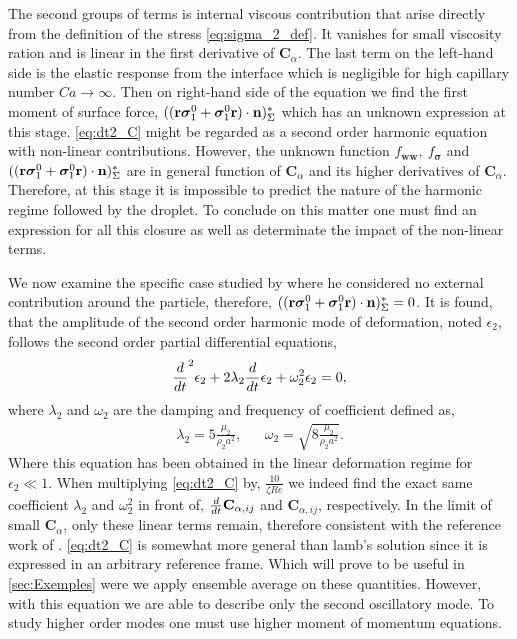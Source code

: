 The second groups of terms is internal viscous contribution that arise directly from the definition of the stress \ref{eq:sigma_2_def}. 
It vanishes for small viscosity ration and is linear in the first derivative of $\textbf{C}_\alpha$. 
The last term on the left-hand side is the elastic response from the interface which is negligible for high capillary number $Ca \to \infty$. 
Then on right-hand side of the equation we find the first moment of surface force, $( (\textbf{r}\bm\sigma_1^0+ \bm\sigma_1^0\textbf{r})\cdot \textbf{n} )_{\Sigma}^*$ which has an unknown expression at this stage. 
\ref{eq:dt2_C} might be regarded as a second order harmonic equation with non-linear contributions. 
However, the unknown function $f_\textbf{ww},\ f_{\bm{\sigma}}$ and $( (\textbf{r}\bm\sigma_1^0+ \bm\sigma_1^0\textbf{r})\cdot \textbf{n} )_{\Sigma}^*$ are in general function of $\textbf{C}_\alpha$ and its higher derivatives of $\textbf{C}_\alpha$.   
Therefore, at this stage it is impossible to predict the nature of the harmonic regime followed by the droplet. 
To conclude on this matter one must find an expression for all this closure as well as determinate the impact of the non-linear terms.

We now examine the specific case studied by \citet{lamb1924hydrodynamics} where he considered no external contribution around the particle, therefore, $( (\textbf{r}\bm\sigma_1^0+ \bm\sigma_1^0\textbf{r})\cdot \textbf{n} )_{\Sigma}^* = 0$.
It is found, that the amplitude of the second order harmonic mode of deformation, noted $\epsilon_2$, follows the second order partial differential equations,  
\begin{equation*}
    \frac{d}{d t}^2{\epsilon_2}
    + 2\lambda_2 \frac{d}{d t} \epsilon_2
    + \omega_2^2 \epsilon_2
     = 0,
\end{equation*}
where $\lambda_2$ and $\omega_2$ are the damping and frequency of coefficient defined as, 
\begin{align*}
    \lambda_2 = 5 \frac{\mu_2}{\rho_2a^2},
    && \omega_2 = \sqrt{8 \frac{\mu_2}{\rho_2 a^2}}.
\end{align*}
Where this equation has been obtained in the linear deformation regime for $\epsilon_2 \ll 1$. 
When multiplying \ref{eq:dt2_C} by, $\frac{10}{\zeta Re}$ we indeed find the exact same coefficient $\lambda_2$ and $\omega_2^2$ in front of, $\frac{d}{d t} \textbf{C}_{\alpha,ij}$ and $\textbf{C}_{\alpha,ij}$, respectively. 
In the limit of small $\textbf{C}_\alpha$, only these linear terms remain, therefore consistent with the reference work of \citet{lamb1924hydrodynamics}. 
\ref{eq:dt2_C} is somewhat more general than lamb's solution since it is expressed in an arbitrary reference frame. 
Which will prove to be useful in \ref{sec:Exemples} were we apply ensemble average on these quantities. 
However, with this equation we are able to describe only the second oscillatory mode. 
To study higher order modes one must use higher moment of momentum equations. 


